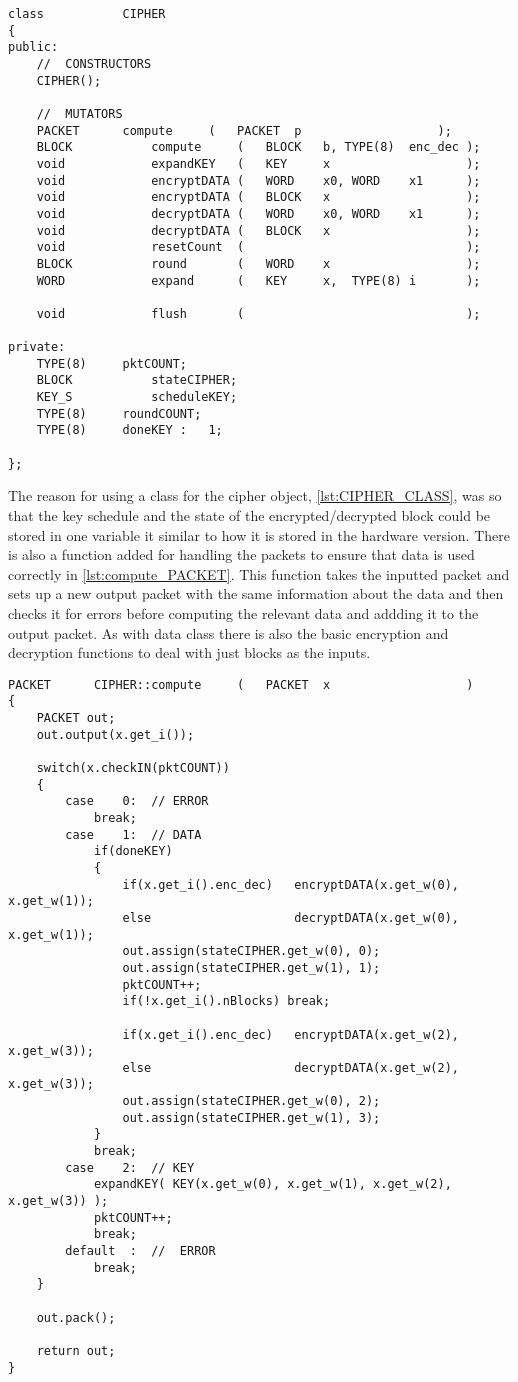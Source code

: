 \documentclass[12pt,twoside,a4paper]{report}
\begin{document}
 	\begin{minipage}{\linewidth}
	\begin{lstlisting}[label={lst:CIPHER_CLASS},caption={The declaration of the CIPHER Class},style=CStyle]	   	
class			CIPHER
{
public:
	//	CONSTRUCTORS
	CIPHER();
	
	//	MUTATORS
	PACKET		compute		(	PACKET	p					);
	BLOCK			compute		(	BLOCK	b, TYPE(8)	enc_dec	);
	void			expandKEY	(	KEY		x					);
	void			encryptDATA	(	WORD	x0,	WORD	x1		);
	void			encryptDATA	(	BLOCK	x					);
	void			decryptDATA	(	WORD	x0,	WORD	x1		);
	void			decryptDATA	(	BLOCK	x					);
	void			resetCount	(								);
	BLOCK			round		(	WORD	x					);
	WORD			expand		(	KEY		x,	TYPE(8)	i		);
	
	void			flush		(								);
	
private:
	TYPE(8)		pktCOUNT;
	BLOCK			stateCIPHER;
	KEY_S			scheduleKEY;
	TYPE(8)		roundCOUNT;
	TYPE(8)		doneKEY	:	1;
	
};
	\end{lstlisting}
	\end{minipage}
   	
   	The reason for using a class for the cipher object, \autoref{lst:CIPHER_CLASS}, was so that the key schedule and the state of the encrypted/decrypted block could be stored in one variable it similar to how it is stored in the hardware version. There is also a function added for handling the packets to ensure that data is used correctly in \autoref{lst:compute_PACKET}. This function takes the inputted packet and sets up a new output packet with the same information about the data and then checks it for errors before computing the relevant data and addding it to the output packet. As with data class there is also the basic encryption and decryption functions to deal with just blocks as the inputs.

 	\begin{minipage}{\linewidth}
	\begin{lstlisting}[label={lst:compute_PACKET},caption={The function for handling the packets},style=CStyle]	
PACKET		CIPHER::compute		(	PACKET	x					)
{
	PACKET out;
	out.output(x.get_i());
	
	switch(x.checkIN(pktCOUNT))
	{
		case	0:	// ERROR
			break;
		case	1:	// DATA
			if(doneKEY)
			{
				if(x.get_i().enc_dec)	encryptDATA(x.get_w(0), x.get_w(1));
				else					decryptDATA(x.get_w(0), x.get_w(1));
				out.assign(stateCIPHER.get_w(0), 0);
				out.assign(stateCIPHER.get_w(1), 1);
				pktCOUNT++;
				if(!x.get_i().nBlocks) break;
				
				if(x.get_i().enc_dec)	encryptDATA(x.get_w(2), x.get_w(3));
				else					decryptDATA(x.get_w(2), x.get_w(3));
				out.assign(stateCIPHER.get_w(0), 2);
				out.assign(stateCIPHER.get_w(1), 3);
			}
			break;
		case	2:	// KEY
			expandKEY( KEY(x.get_w(0), x.get_w(1), x.get_w(2), x.get_w(3)) );
			pktCOUNT++;
			break;
		default	 :	//	ERROR
			break;
	}
	
	out.pack();
	
	return out;
}
	\end{lstlisting}
	\end{minipage}
    
\end{document}
